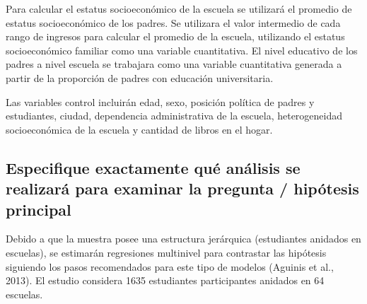 \documentclass[
  12pt,
]{article}
\begin{document}
Para calcular el estatus socioeconómico de la escuela se utilizará el
promedio de estatus socioeconómico de los padres. Se utilizara el valor
intermedio de cada rango de ingresos para calcular el promedio de la
escuela, utilizando el estatus socioeconómico familiar como una variable
cuantitativa. El nivel educativo de los padres a nivel escuela se
trabajara como una variable cuantitativa generada a partir de la
proporción de padres con educación universitaria.

Las variables control incluirán edad, sexo, posición política de padres
y estudiantes, ciudad, dependencia administrativa de la escuela,
heterogeneidad socioeconómica de la escuela y cantidad de libros en el
hogar.

\hypertarget{especifique-exactamente-quuxe9-anuxe1lisis-se-realizaruxe1-para-examinar-la-pregunta-hipuxf3tesis-principal}{%
\subsection{Especifique exactamente qué análisis se realizará para
examinar la pregunta / hipótesis
principal}\label{especifique-exactamente-quuxe9-anuxe1lisis-se-realizaruxe1-para-examinar-la-pregunta-hipuxf3tesis-principal}}

Debido a que la muestra posee una estructura jerárquica (estudiantes
anidados en escuelas), se estimarán regresiones multinivel para
contrastar las hipótesis siguiendo los pasos recomendados para este tipo
de modelos (Aguinis et al., 2013). El estudio considera 1635 estudiantes
participantes anidados en 64 escuelas.
\end{document}
